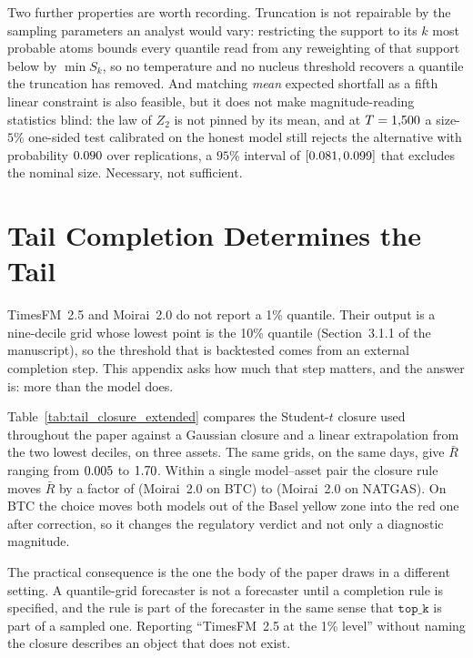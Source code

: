 \documentclass[preprint,11pt,authoryear]{elsarticle}
\newcommand{\1}{\boldsymbol{1}}
\begin{document}
Two further properties are worth recording. Truncation is not repairable by the
sampling parameters an analyst would vary: restricting the support to its $k$
most probable atoms bounds every quantile read from any reweighting of that
support below by $\min S_k$, so no temperature and no nucleus threshold recovers
a quantile the truncation has removed. And matching \emph{mean} expected
shortfall as a fifth linear constraint is also feasible, but it does not make
magnitude-reading statistics blind: the law of $Z_2$ is not pinned by its mean,
and at $T = 1{,}500$ a size-$5\%$ one-sided test calibrated on the honest
model still rejects the alternative with probability $0.090$ over
\nSupPowerReps{} replications, a $95\%$ interval of $[0.081,
0.099]$ that excludes the nominal size. Necessary, not
sufficient.

\section{Tail Completion Determines the Tail}
\label{app:tail_closure}

TimesFM~2.5 and Moirai~2.0 do not report a 1\% quantile. Their output is a
nine-decile grid whose lowest point is the 10\% quantile
(Section~3.1.1 of the manuscript), so the threshold that is backtested comes from an
external completion step. This appendix asks how much that step matters, and the
answer is: more than the model does.

Table~\ref{tab:tail_closure_extended} compares the Student-$t$ closure used
throughout the paper against a Gaussian closure and a linear extrapolation from
the two lowest deciles, on three assets. The same grids, on the same days, give
$\bar R$ ranging from $0.005$ to $1.70$. Within a single
model--asset pair the closure rule moves $\bar R$ by a factor of
\nSupClosureFactorLo{} (Moirai~2.0 on BTC) to \nSupClosureFactorHi{}
(Moirai~2.0 on NATGAS). On BTC the choice moves both models out of the Basel
yellow zone into the red one after correction, so it changes the regulatory
verdict and not only a diagnostic magnitude.

The practical consequence is the one the body of the paper draws in a different
setting. A quantile-grid forecaster is not a forecaster until a completion rule
is specified, and the rule is part of the forecaster in the same sense that
$\texttt{top\_k}$ is part of a sampled one. Reporting ``TimesFM~2.5 at the 1\%
level'' without naming the closure describes an object that does not exist.
\end{document}
